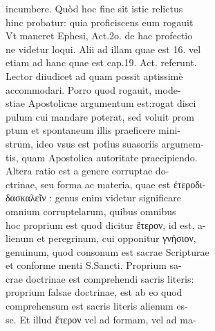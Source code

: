 \documentclass{article}
\begin{document}
\begin{pages}
                incumbere. Quòd hoc fine sit istic relictus \\
                hinc probatur: quia proficiscens eum rogauit \\
                Vt maneret Ephesi, Act.2o. de hac profectio \\
                ne videtur loqui. Alii ad illam quae est 16. vel \\
                etiam ad hanc quae est cap.19. Act. referunt. \\
                Lector diiudicet ad quam possit aptissimè \\
                accommodari. Porro quod rogauit, mode- \\
                stiae Apostolicae argumentum est:rogat disci \\
                pulum cui mandare poterat, sed voluit prom \\
                ptum et spontaneum illis praeficere mini- \\
                strum, ideo vsus est potius suasoriis argumem- \\
                tis, quam Apostolica autoritate praecipiendo. \\
                Altera ratio est a genere corruptae do- \\
                ctrinae, seu forma ac materia, quae est έτεροδι- \\
                δασκαλεῖν : genus enim videtur significare \\
                omnium corruptelarum, quibus omnibus \\
                hoc proprium est quod dicitur ἕτερον, id est, a- \\
                lienum et peregrinum, cui opponitur γνήσιον, \\
                genuinum, quod consonum est sacrae Scripturae \\
                et conforme menti S.Sancti. Proprium sa- \\
                crae doctrinae est comprehendi sacris literis: \\
                proprium falsae doctrinae, est ab eo quod \\
                comprehensum est sacris literis alienum es- \\
                se. Et illud ἕτερον vel ad formam, vel ad ma- \\

\end{pages}
\end{document}
